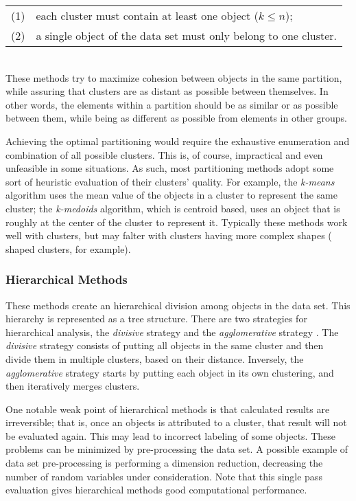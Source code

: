 \begin{tabular}{l l}
  (1) & each cluster must contain at least one object ($k \leq n$);\\
  (2) & a single object of the data set must only belong to one cluster.\\
\end{tabular}\\

These methods try to maximize cohesion between objects in the same partition,
while assuring that clusters are as distant as possible between themselves. In
other words, the elements within a partition should be as similar or 
as possible between them, while being as different as possible from elements in
other groups.

Achieving the optimal partitioning would require the exhaustive enumeration and
combination of all possible clusters. This is, of course, impractical and even
unfeasible in some situations. As such, most partitioning methods adopt some
sort of heuristic evaluation of their clusters' quality. For example, the
\emph{k-means} algorithm uses the mean value of the objects in a cluster to
represent the same cluster; the \emph{k-medoids} algorithm, which is
centroid based, uses an object that is roughly at the center of the cluster to
represent it. Typically these methods work well with  clusters,
but may falter with clusters having more complex shapes ( shaped
clusters, for example).

\subsubsection*{Hierarchical Methods}

These methods create an hierarchical division among objects in the data set.
This hierarchy is represented as a tree structure. There are two strategies for
hierarchical analysis, the \emph{divisive} strategy and the \emph{agglomerative}
strategy \cite{han2006data}. The \emph{divisive} strategy consists of putting
all objects in the same cluster and then divide them in multiple clusters, based
on their distance. Inversely, the \emph{agglomerative} strategy starts by
putting each object in its own clustering, and then iteratively merges clusters.

One notable weak point of hierarchical methods is that calculated results are
irreversible; that is, once an objects is attributed to a cluster, that result
will not be evaluated again. This may lead to incorrect labeling of some
objects. These problems can be minimized by pre-processing the data set. A
possible example of data set pre-processing is performing a dimension reduction,
decreasing the number of random variables under consideration. Note that this
single pass evaluation gives hierarchical methods good computational
performance.

